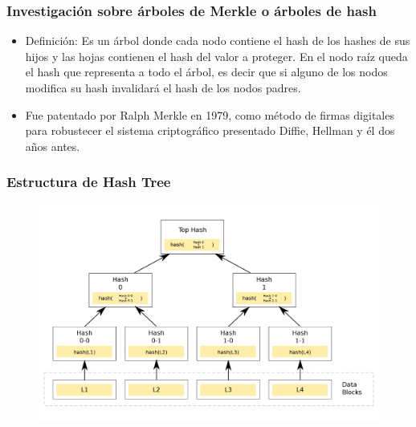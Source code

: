 \documentclass[10pt, a4paper,english,spanish]{beamer}
\begin{document}
\begin{frame}
\frametitle{Investigaci\'on sobre \'arboles de Merkle o \'arboles de hash}
\begin{itemize}

\item Definici\'on: Es un \'arbol donde cada nodo contiene el hash de los hashes de sus hijos y las hojas contienen el hash del valor a proteger. En el nodo ra\'iz queda el hash que representa a todo el \'arbol, es decir que si alguno de los nodos modifica su hash invalidar\'a el hash de los nodos padres.
\item Fue patentado por Ralph Merkle en 1979, como m\'etodo de firmas digitales para robustecer el sistema criptogr\'afico presentado Diffie, Hellman y \'el dos a\~nos antes.

\end{itemize}
\end{frame}


\begin{frame}
\frametitle{Estructura de Hash Tree}

\begin{figure}
  \includegraphics[width=\linewidth]{imagenes/hash_tree.png}
\end{figure}

\end{frame}
\end{document}
